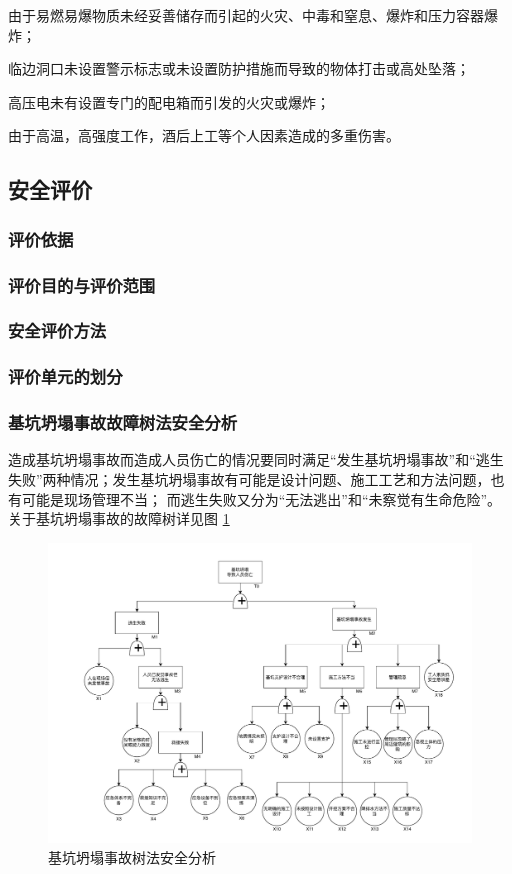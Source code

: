  由于易燃易爆物质未经妥善储存而引起的火灾、中毒和窒息、爆炸和压力容器爆炸；

 临边洞口未设置警示标志或未设置防护措施而导致的物体打击或高处坠落；

 高压电未有设置专门的配电箱而引发的火灾或爆炸；

 由于高温，高强度工作，酒后上工等个人因素造成的多重伤害。

\subsection{安全评价}
\subsubsection{评价依据}
\subsubsection{评价目的与评价范围}
\subsubsection{安全评价方法}
\subsubsection{评价单元的划分}
\subsubsection{基坑坍塌事故故障树法安全分析}

造成基坑坍塌事故而造成人员伤亡的情况要同时满足“发生基坑坍塌事故”和“逃生失败”两种情况；发生基坑坍塌事故有可能是设计问题、施工工艺和方法问题，也有可能是现场管理不当；
而逃生失败又分为“无法逃出”和“未察觉有生命危险”。关于基坑坍塌事故的故障树详见图 \ref{fig:c3f1}

\begin{figure}[thbp!]
    \centering
    \includegraphics[width=1.0\linewidth]{figure/Untitled Diagram.pdf}
    \caption{基坑坍塌事故树法安全分析}
    \label{fig:c3f1}
\end{figure}

